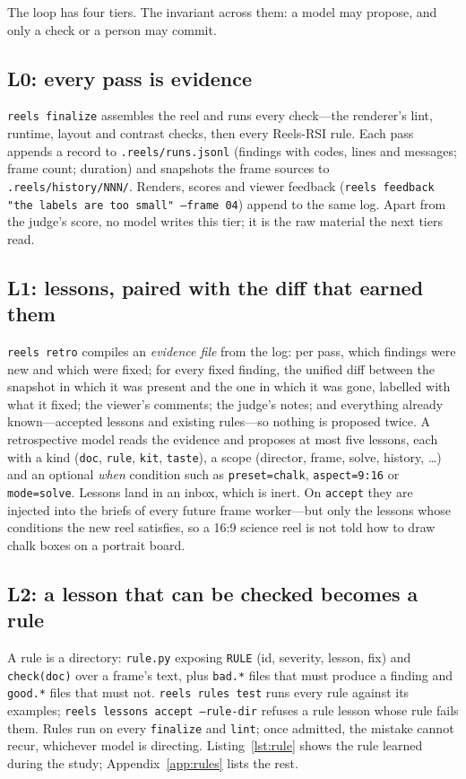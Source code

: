 \documentclass[11pt]{article}
\newcommand{\sys}{Reels-RSI}
\begin{document}
The loop has four tiers. The invariant across them: a model may propose, and only a check or a
person may commit.

\subsection{L0: every pass is evidence}
\texttt{reels finalize} assembles the reel and runs every check---the renderer's lint, runtime,
layout and contrast checks, then every \sys{} rule. Each pass appends a record to
\texttt{.reels/runs.jsonl} (findings with codes, lines and messages; frame count; duration) and
snapshots the frame sources to \texttt{.reels/history/NNN/}. Renders, scores and viewer feedback
(\texttt{reels feedback "the labels are too small" --frame 04}) append to the same log. Apart from the
judge's score, no model writes this tier; it is the raw material the next tiers read.

\subsection{L1: lessons, paired with the diff that earned them}
\texttt{reels retro} compiles an \emph{evidence file} from the log: per pass, which findings were new
and which were fixed; for every fixed finding, the unified diff between the snapshot in which it was
present and the one in which it was gone, labelled with what it fixed; the viewer's comments; the
judge's notes; and everything already known---accepted lessons and existing rules---so nothing is
proposed twice. A retrospective model reads the evidence and proposes at most five lessons, each with
a kind (\texttt{doc}, \texttt{rule}, \texttt{kit}, \texttt{taste}), a scope (director, frame, solve,
history, \ldots) and an optional \emph{when} condition such as \texttt{preset=chalk},
\texttt{aspect=9:16} or \texttt{mode=solve}. Lessons land in an inbox, which is inert. On
\texttt{accept} they are injected into the briefs of every future frame worker---but only the lessons
whose conditions the new reel satisfies, so a 16:9 science reel is not told how to draw chalk boxes
on a portrait board.

\subsection{L2: a lesson that can be checked becomes a rule}
\label{sec:rules}
A rule is a directory: \texttt{rule.py} exposing \texttt{RULE} (id, severity, lesson, fix) and
\texttt{check(doc)} over a frame's text, plus \texttt{bad.*} files that must produce a finding and
\texttt{good.*} files that must not. \texttt{reels rules test} runs every rule against its examples;
\texttt{reels lessons accept --rule-dir} refuses a rule lesson whose rule fails them. Rules run on
every \texttt{finalize} and \texttt{lint}; once admitted, the mistake cannot recur, whichever model is
directing. Listing~\ref{lst:rule} shows the rule learned during the study; Appendix~\ref{app:rules}
lists the rest.
\end{document}
